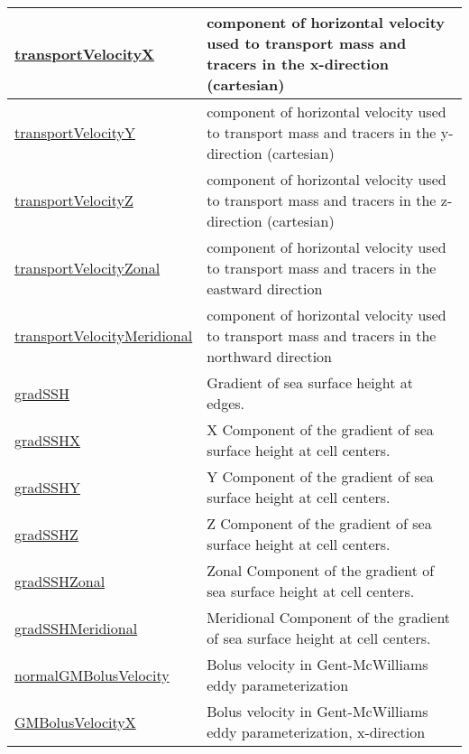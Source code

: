 {\begin{center}
\begin{longtable}{| p{2.0in} | p{4.0in} |}
	\hline
	\hyperref[subsec:var_sec_diagnostics_transportVelocityX]{transportVelocityX} & component of horizontal velocity used to transport mass and tracers in the x-direction (cartesian) \\
	\hline
	\hyperref[subsec:var_sec_diagnostics_transportVelocityY]{transportVelocityY} & component of horizontal velocity used to transport mass and tracers in the y-direction (cartesian) \\
	\hline
	\hyperref[subsec:var_sec_diagnostics_transportVelocityZ]{transportVelocityZ} & component of horizontal velocity used to transport mass and tracers in the z-direction (cartesian) \\
	\hline
	\hyperref[subsec:var_sec_diagnostics_transportVelocityZonal]{transportVelocityZonal} & component of horizontal velocity used to transport mass and tracers in the eastward direction \\
	\hline
	\hyperref[subsec:var_sec_diagnostics_transportVelocityMeridional]{transportVelocityMeridional} & component of horizontal velocity used to transport mass and tracers in the northward direction \\
	\hline
	\hyperref[subsec:var_sec_diagnostics_gradSSH]{gradSSH} & Gradient of sea surface height at edges. \\
	\hline
	\hyperref[subsec:var_sec_diagnostics_gradSSHX]{gradSSHX} & X Component of the gradient of sea surface height at cell centers. \\
	\hline
	\hyperref[subsec:var_sec_diagnostics_gradSSHY]{gradSSHY} & Y Component of the gradient of sea surface height at cell centers. \\
	\hline
	\hyperref[subsec:var_sec_diagnostics_gradSSHZ]{gradSSHZ} & Z Component of the gradient of sea surface height at cell centers. \\
	\hline
	\hyperref[subsec:var_sec_diagnostics_gradSSHZonal]{gradSSHZonal} & Zonal Component of the gradient of sea surface height at cell centers. \\
	\hline
	\hyperref[subsec:var_sec_diagnostics_gradSSHMeridional]{gradSSHMeridional} & Meridional Component of the gradient of sea surface height at cell centers. \\
	\hline
	\hyperref[subsec:var_sec_diagnostics_normalGMBolusVelocity]{normalGMBolusVelocity} & Bolus velocity in Gent-McWilliams eddy parameterization \\
	\hline
	\hyperref[subsec:var_sec_diagnostics_GMBolusVelocityX]{GMBolusVelocityX} & Bolus velocity in Gent-McWilliams eddy parameterization, x-direction \\

\end{longtable}
\end{center}}
